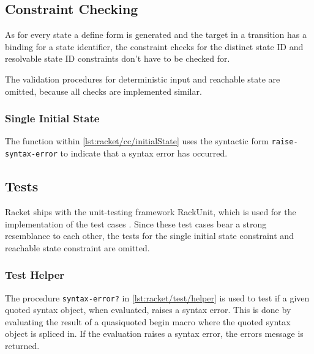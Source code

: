 

\subsection{Constraint Checking}
\label{ss:racket/cc}

As for every state a define form is generated and the target in a transition has a binding for a state identifier, the constraint checks for the distinct state ID and resolvable state ID constraints don't have to be checked for.

The validation procedures for deterministic input and reachable state are omitted, because all checks are implemented similar.

\subsubsection{Single Initial State}

The function within \autoref{lst:racket/cc/initialState} uses the syntactic form \lstinline{raise-syntax-error} to indicate that a syntax error has occurred.



\subsection{Tests}

Racket ships with the unit-testing framework RackUnit, which is used for the implementation of the test cases \cite{rackunit}.
Since these test cases bear a strong resemblance to each other, the tests for the single initial state constraint and reachable state constraint are omitted.

\subsubsection{Test Helper}

The procedure \lstinline{syntax-error?} in \autoref{lst:racket/test/helper} is used to test if a given quoted syntax object, when evaluated, raises a syntax error.
This is done by evaluating the result of a quasiquoted begin macro where the quoted syntax object is spliced in.
If the evaluation raises a syntax error, the errors message is returned.

